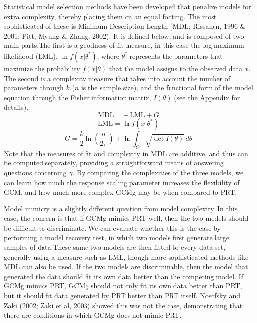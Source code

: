 \documentclass[11pt]{article}
\begin{document}
Statistical model selection methods have been developed that penalize models for extra complexity,
thereby placing them on an equal footing. The most sophisticated of these is Minimum Description
Length (MDL; Rissanen, 1996 \& 2001; Pitt, Myung \& Zhang, 2002). It is defined below, and is
composed of two main parts.\footnotemark[3] The first is a goodness-of-fit measure, in this case
the log maximum likelihood (LML), $\ln f(x|\theta^*)$, where $\theta^*$ represents the parameters
that maximize the probability $f(x|\theta)$ that the model assigns to the observed data $x$. The
second is a complexity measure that takes into account the number of parameters through $k$ ($n$
is the sample size), and the functional form of the model equation through the Fisher information
matrix, $I(\theta)$ (see the Appendix for details).
\begin{equation}\label{mdl}
\mbox{MDL} = -\ \mbox{LML} + G \nonumber
\end{equation}
\begin{equation}\label{ml}
\mbox{LML} = \ln f(x|\theta^*)
\end{equation}
\begin{equation}\label{gc}
G = \frac{k}{2} \ln \left( \frac{n}{2\pi} \right) + \ln \int_\Theta \sqrt{\det I(\theta)} \,
d\theta \nonumber
\end{equation}
Note that the measures of fit and complexity in MDL are additive, and thus can be computed
separately, providing a straightforward means of answering questions concerning
$\gamma$. %
By comparing the complexities of the three models, we can learn how much the response scaling
parameter increases the flexibility of GCM, and how much more complex GCMg may be when compared to
PRT.


Model mimicry is a slightly different question from model complexity. In this case, the concern is
that if GCMg mimics PRT well, then the two models should be difficult to discriminate. We can
evaluate whether this is the case by performing a model recovery test, in which two models first
generate large samples of data.\footnotemark[4] These same two models are then fitted to every
data set, generally using a measure such as LML, though more sophisticated methods like MDL can
also be used. If the two models are discriminable, then the model that generated the data should
fit its own data better than the competing model. If GCMg mimics PRT, GCMg should not only fit its
own data better than PRT, but it should fit data generated by PRT better than PRT itself. Nosofsky
and Zaki (2002; Zaki et al, 2003) showed this was not the case, demonstrating that there are conditions
in which GCMg does not mimic PRT.
\end{document}
